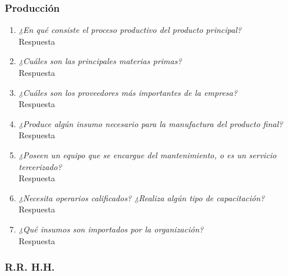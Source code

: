 \documentclass[a4paper,10pt]{article}
\begin{document}
\subsubsection{Producción}
			\begin{enumerate}[resume]
				\item \textit{¿En qué consiste el proceso productivo del producto principal?}\\
				
				Respuesta
				
				
				\item \textit{¿Cuáles son las principales materias primas?}\\
				
				Respuesta
				
				\item \textit{¿Cuáles son los proveedores más importantes de la empresa?}\\
				
				Respuesta
				
				\item \textit{¿Produce algún insumo necesario para la manufactura del producto final?}\\
				
				Respuesta
				
				\item \textit{¿Poseen un equipo que se encargue del mantenimiento, o es un servicio tercerizado?}\\
				
				Respuesta
				
				\item \textit{¿Necesita operarios calificados? ¿Realiza algún tipo de capacitación?}\\
				
				Respuesta
				
				\item \textit{¿Qué insumos son importados por la organización?}\\
				
				Respuesta				
			
			\end{enumerate}			
			
	\subsubsection{R.R. H.H.}
		
\end{document}
